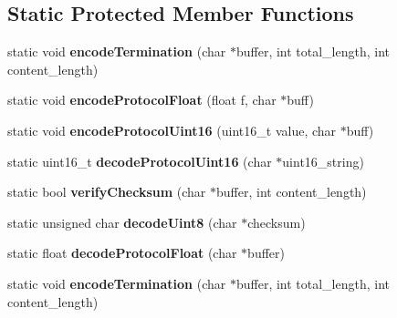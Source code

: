 \subsection*{Static Protected Member Functions}
\begin{DoxyCompactItemize}
\item 
\hypertarget{class_i_m_u_protocol_acbe9e784a43ab31c543c772711d0b389}{}static void {\bfseries encode\+Termination} (char $\ast$buffer, int total\+\_\+length, int content\+\_\+length)\label{class_i_m_u_protocol_acbe9e784a43ab31c543c772711d0b389}

\item 
\hypertarget{class_i_m_u_protocol_ad9d78b08dd74af878782c0f4a6c16951}{}static void {\bfseries encode\+Protocol\+Float} (float f, char $\ast$buff)\label{class_i_m_u_protocol_ad9d78b08dd74af878782c0f4a6c16951}

\item 
\hypertarget{class_i_m_u_protocol_af7156807ea5a0488e8eff2beeb1bac40}{}static void {\bfseries encode\+Protocol\+Uint16} (uint16\+\_\+t value, char $\ast$buff)\label{class_i_m_u_protocol_af7156807ea5a0488e8eff2beeb1bac40}

\item 
\hypertarget{class_i_m_u_protocol_a155fa4ff91c441d040988f656094f086}{}static uint16\+\_\+t {\bfseries decode\+Protocol\+Uint16} (char $\ast$uint16\+\_\+string)\label{class_i_m_u_protocol_a155fa4ff91c441d040988f656094f086}

\item 
\hypertarget{class_i_m_u_protocol_ade30772ce94446e5591501a705a22b3f}{}static bool {\bfseries verify\+Checksum} (char $\ast$buffer, int content\+\_\+length)\label{class_i_m_u_protocol_ade30772ce94446e5591501a705a22b3f}

\item 
\hypertarget{class_i_m_u_protocol_a9fae2bd9c887a61936343d7e02d745ed}{}static unsigned char {\bfseries decode\+Uint8} (char $\ast$checksum)\label{class_i_m_u_protocol_a9fae2bd9c887a61936343d7e02d745ed}

\item 
\hypertarget{class_i_m_u_protocol_a91e3d5e6f18c6ebf8499216df493d2f5}{}static float {\bfseries decode\+Protocol\+Float} (char $\ast$buffer)\label{class_i_m_u_protocol_a91e3d5e6f18c6ebf8499216df493d2f5}

\item 
\hypertarget{class_i_m_u_protocol_acbe9e784a43ab31c543c772711d0b389}{}static void {\bfseries encode\+Termination} (char $\ast$buffer, int total\+\_\+length, int content\+\_\+length)\label{class_i_m_u_protocol_acbe9e784a43ab31c543c772711d0b389}


\end{DoxyCompactItemize}
